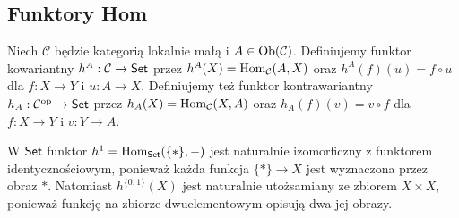 \subsection{Funktory Hom}

\begin{definicja}\label{def:hom-funktory}
Niech $\mathcal C$ będzie kategorią lokalnie małą i $A\in\operatorname{Ob}(\mathcal C)$. Definiujemy funktor kowariantny $h^A:\mathcal C\to\mathsf{Set}$ przez $h^A(X)=\operatorname{Hom}_{\mathcal C}(A,X)$ oraz $h^A(f)(u)=f\circ u$ dla $f:X\to Y$ i $u:A\to X$. Definiujemy też funktor kontrawariantny $h_A:\mathcal C^{\mathrm{op}}\to\mathsf{Set}$ przez $h_A(X)=\operatorname{Hom}_{\mathcal C}(X,A)$ oraz $h_A(f)(v)=v\circ f$ dla $f:X\to Y$ i $v:Y\to A$.
\end{definicja}

\begin{przyklad}
W $\mathsf{Set}$ funktor $h^1=\operatorname{Hom}_{\mathsf{Set}}(\{*\},-)$ jest naturalnie izomorficzny z funktorem identycznościowym, ponieważ każda funkcja $\{*\}\to X$ jest wyznaczona przez obraz $*$. Natomiast $h^{\{0,1\}}(X)$ jest naturalnie utożsamiany ze zbiorem $X\times X$, ponieważ funkcję na zbiorze dwuelementowym opisują dwa jej obrazy.
\end{przyklad}


